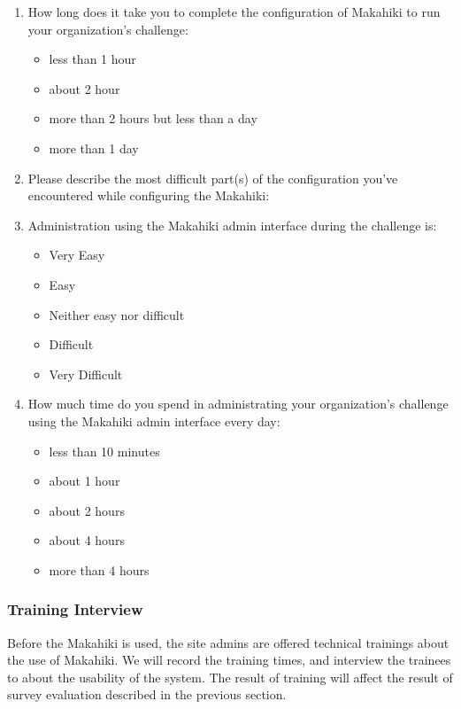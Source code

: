 \documentclass[11pt]{article}
\begin{document}
\begin{enumerate}
\item How long does it take you to complete the configuration of Makahiki to run your organization's challenge: 
\begin{itemize}
\item less than 1 hour
\item about 2 hour
\item more than 2 hours but less than a day
\item more than 1 day
\end{itemize}

\item Please describe the most difficult part(s) of the configuration you've encountered while configuring the Makahiki:

\item Administration using the Makahiki admin interface during the challenge is: 
\begin{itemize}
\item Very Easy
\item Easy
\item Neither easy nor difficult
\item Difficult
\item Very Difficult
\end{itemize}

\item How much time do you spend in administrating your organization's challenge using the Makahiki admin interface every day: 
\begin{itemize}
\item less than 10 minutes
\item about 1 hour
\item about 2 hours
\item about 4 hours
\item more than 4 hours
\end{itemize}

\end{enumerate}

\subsubsection{Training Interview}
Before the Makahiki is used, the site admins are offered technical trainings about the use of Makahiki. We will record the training times, and interview the trainees to about the usability of the system. The result of training will affect the result of survey evaluation described in the previous section.
\end{document}
